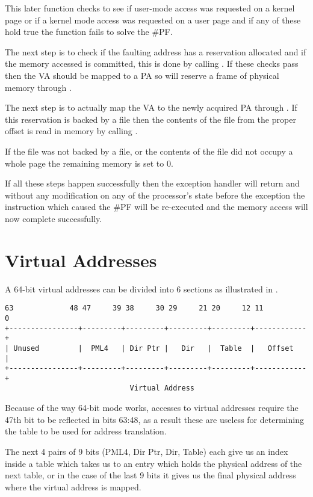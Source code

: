 \begin{appendices}
This later function checks to see if user-mode access was requested on a kernel page or if a kernel
mode access was requested on a user page and if any of these hold true the function fails to solve
the \#PF.

The next step is to check if the faulting address has a reservation allocated and if the memory
accessed is committed, this is done by calling . If these
checks pass then the VA should be mapped to a PA so \projectname will reserve a frame of
physical memory through .

The next step is to actually map the VA to the newly acquired PA through .
If this reservation is backed by a file then the contents of the file from the proper offset is read
in memory by calling .

If the file was not backed by a file, or the contents of the file did not occupy a whole page the
remaining memory is set to 0.

If all these steps happen successfully then the exception handler will return and without any
modification on any of the processor's state before the exception the instruction which caused the
\#PF will be re-executed and the memory access will now complete successfully.

\section{Virtual Addresses}
\label{sect:VirtAddr}

A 64-bit virtual addresses can be divided into 6 sections as illustrated in .

\begin{verbatim}
63             48 47     39 38     30 29     21 20     12 11          0
+----------------+---------+---------+---------+---------+------------+
| Unused         |  PML4   | Dir Ptr |   Dir   |  Table  |   Offset   |
+----------------+---------+---------+---------+---------+------------+
                             Virtual Address
\end{verbatim}

Because of the way 64-bit mode works, accesses to virtual addresses require the 47th bit to be
reflected in bits 63:48, as a result these are useless for determining the table to be used for
address translation.

The next 4 pairs of 9 bits (PML4, Dir Ptr, Dir, Table) each give us an index inside a table which
takes us to an entry which holds the physical address of the next table, or in the case of the last
9 bits it gives us the final physical address where the virtual address is mapped.


\end{appendices}
